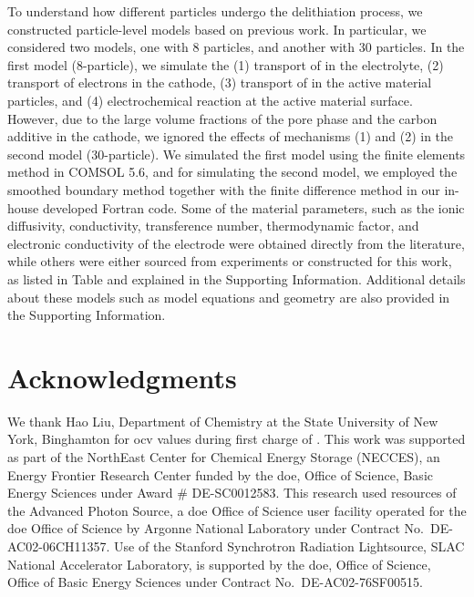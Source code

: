 \documentclass{article}
\begin{document}
To understand how different particles undergo the delithiation
process, we constructed particle-level models based on previous work. In particular, we considered two models, one with 8
particles, and another with 30 particles. In the first model
(8-particle), we simulate the (1) transport of  in the
electrolyte, (2) transport of electrons in the cathode, (3) transport
of  in the active material particles, and (4) electrochemical
reaction at the active material surface. However, due to the large
volume fractions of the pore phase and the carbon additive in the
cathode, we ignored the effects of mechanisms (1) and (2) in the
second model (30-particle). We simulated the first model using the
finite elements method in COMSOL 5.6, and for simulating the second
model, we employed the smoothed boundary method \cite{thornton2012}
together with the finite difference method in our in-house developed
Fortran code. Some of the material parameters, such as the ionic
diffusivity, conductivity, transference number, thermodynamic factor,
and electronic conductivity of the \nca{} electrode were obtained
directly from the literature\cite{lindbergh2008,lindbergh2008-2},
while others were either sourced from experiments or constructed for
this work, as listed in Table  and
explained in the Supporting Information. Additional details about
these models such as model equations and geometry are also provided in
the Supporting Information.


\section*{Acknowledgments}

We thank Hao Liu, Department of Chemistry at the State University of
New York, Binghamton for \gls{ocv} values during first charge of
\nca{}. This work was supported as part of the NorthEast Center for
Chemical Energy Storage (NECCES), an Energy Frontier Research Center
funded by the \gls{doe}, Office of Science, Basic Energy Sciences
under Award \# DE-SC0012583. This research used resources of the
Advanced Photon Source, a \gls{doe} Office of Science user facility
operated for the \gls{doe} Office of Science by Argonne National
Laboratory under Contract No.\ DE-AC02-06CH11357. Use of the Stanford
Synchrotron Radiation Lightsource, SLAC National Accelerator
Laboratory, is supported by the \gls{doe}, Office of Science, Office
of Basic Energy Sciences under Contract No.\ DE-AC02-76SF00515.


\newpage
\end{document}
